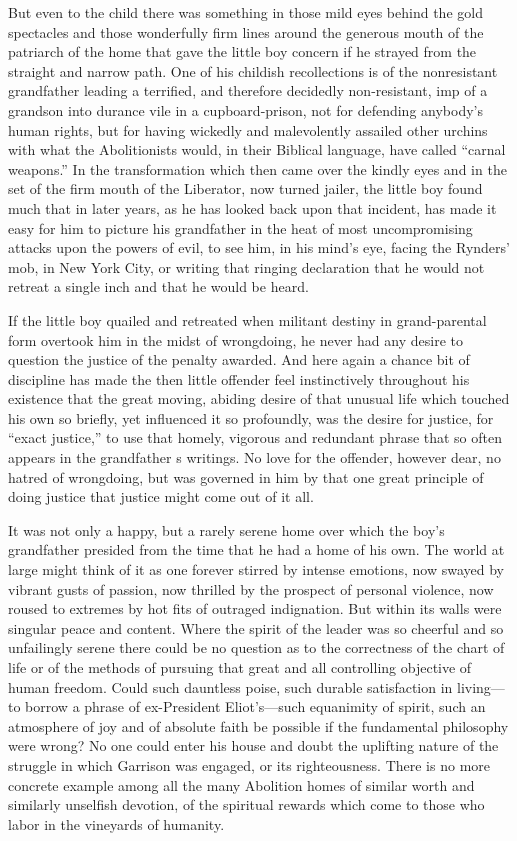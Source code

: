 \documentclass{book}
\begin{document}
But even to the child there was something in those mild eyes behind the gold spectacles and those wonderfully firm lines around the generous mouth of the patriarch of the home that gave the little boy concern if he strayed from the straight and narrow path. One of his childish recollections is of the nonresistant grandfather leading a terrified, and therefore decidedly non-resistant, imp of a grandson into durance vile in a cupboard-prison, not for defending anybody’s human rights, but for having wickedly and malevolently assailed other urchins with what the Abolitionists would, in their Biblical language, have called “carnal weapons.” In the transformation which then came over the kindly eyes and in the set of the firm mouth of the Liberator, now turned jailer, the little boy found much that in later years, as he has looked back upon that incident, has made it easy for him to picture his grandfather in the heat of most uncompromising attacks upon the powers of evil, to see him, in his mind’s eye, facing the Rynders’ mob, in New York City, or writing that ringing declaration that he would not retreat a single inch and that he would be heard.

If the little boy quailed and retreated when militant destiny in grand-parental form overtook him in the midst of wrongdoing, he never had any desire to question the justice of the penalty awarded. And here again a chance bit of discipline has made the then little offender feel instinctively throughout his existence that the great moving, abiding desire of that unusual life which touched his own so briefly, yet influenced it so profoundly, was the desire for justice, for “exact justice,” to use that homely, vigorous and redundant phrase that so often appears in the grandfather s writings. No love for the offender, however dear, no hatred of wrongdoing, but was governed in him by that one great principle of doing justice that justice might come out of it all.

It was not only a happy, but a rarely serene home over which the boy’s grandfather presided from the time that he had a home of his own. The world at large might think of it as one forever stirred by intense emotions, now swayed by vibrant gusts of passion, now thrilled by the prospect of personal violence, now roused to extremes by hot fits of outraged indignation. But within its walls were singular peace and content. Where the spirit of the leader was so cheerful and so unfailingly serene there could be no question as to the correctness of the chart of life or of the methods of pursuing that great and all controlling objective of human freedom. Could such dauntless poise, such durable satisfaction in living—to borrow a phrase of ex-President Eliot’s—such equanimity of spirit, such an atmosphere of joy and of absolute faith be possible if the fundamental philosophy were wrong? No one could enter his house and doubt the uplifting nature of the struggle in which Garrison was engaged, or its righteousness. There is no more concrete example among all the many Abolition homes of similar worth and similarly unselfish devotion, of the spiritual rewards which come to those who labor in the vineyards of humanity.
\end{document}
